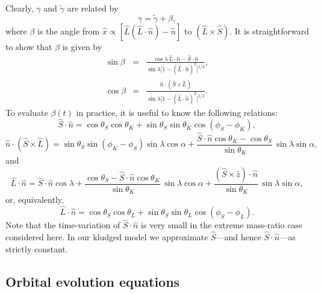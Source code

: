 \documentclass[11pt]{report}
\def\be{\begin{equation}}
\def\ee{\end{equation}}
\begin{document}
Clearly, $\gamma$  and $\tilde \gamma$ are related by
\be\label{beta}
\gamma = \tilde\gamma + \beta,
\ee
where $\beta$ is the angle from $\hat x \propto [\hat L(\hat L \cdot \hat n)
- \hat n] $ to $(\hat L \times \hat S)$.
It is straightforward to show that $\beta$ is given by
\begin{eqnarray}\label{sinbeta}
\sin\beta &=& \frac{\cos\lambda\, \hat L\cdot\hat n -\hat S\cdot \hat n }
{\sin\lambda\bigl[1 - (\hat L\cdot\hat n)^2\bigr]^{1/2}}, \nonumber \\
\cos\beta &=& \frac{\hat n \cdot (\hat S \times \hat L)}
{\sin\lambda\bigl[1 - (\hat L\cdot\hat n)^2\bigr]^{1/2} }.
\end{eqnarray}
To evaluate $\beta(t)$ in practice, it is useful to know the following
relations:
\be\label{SdotN}
{ \hat S}\cdot{ \hat n} = \cos\theta_S \cos\theta_K
+ \sin\theta_S \sin\theta_K \cos(\phi_S-\phi_K),
\ee
\be\label{ScrossLdotN}
\hat n \cdot (\hat S \times \hat L) =
\sin\theta_S \sin(\phi_K-\phi_S)\sin\lambda \cos\alpha
+ \frac{\hat S\cdot\hat n \cos\theta_K -\cos\theta_S}{\sin\theta_K}
\, \sin\lambda \sin\alpha,
\ee
and
\be\label{LdotN}
{ \hat L}\cdot{ \hat n} = { \hat S}\cdot{ \hat n}\cos\lambda
+ \frac{\cos\theta_S - \hat S\cdot\hat n \cos\theta_K}{\sin\theta_K}
\, \sin\lambda \cos\alpha + \frac{(\hat S \times \bar z)\cdot \hat n}
{\sin\theta_K}  \, \sin\lambda \sin\alpha,
\ee
or, equivalently,
\be\label{2LdotN}
{ \hat L}\cdot{ \hat n} = \cos\theta_S \cos\theta_L +
\sin\theta_S \sin\theta_L \cos(\phi_S-\phi_L).
\ee
Note that the time-variation of ${ \hat S}\cdot{ \hat n}$ is very small
in the extreme mass-ratio case considered here.
In our kludged model we approximate $\hat S$---and hence ${\hat S}\cdot{\hat n}$---as strictly constant.


\subsection{Orbital evolution equations}
\label{EvEq}
\end{document}
